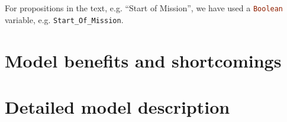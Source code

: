 \documentclass{template/openetcs_report}
\newcommand{\Ada}[1]{\lstinline[language=Ada,basicstyle={\sffamily},framesep=0pt]{#1}}
\begin{document}
For propositions in the text, e.g. ``Start of Mission'', we have used
a \Ada{Boolean} variable, e.g. \Ada{Start_Of_Mission}.

\chapter{Model benefits and shortcomings}

\chapter{Detailed model description}






\end{document}
